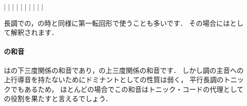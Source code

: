 \documentclass[dvipdfmx,uplatex,b5paper,openany,jbase=12Q,nomag*,textwidth-limit=44%
               ]{gachimuchi}[2020/05/05]
\begin{document}
\begin{floatMusic}[pos=ht]%
  \Startpiece%
  \znotes|\en
  \NOTes
  |%
  \en\bar
  \NOTEs
  |%
  \en\doublebar
  \NOTEs
  |%
  \en\bar
  \NOTEs
  |%
  \en\doublebar
  \NOTes
  |%
  \en\bar
  \NOTes
  \Mryaku\sk%
  |%
  \Mryaku\sk
  \en\setdoublebar
  \endpiece%
\end{floatMusic}

長調での\Gnii\Min ，\Gnii\Dimt の時と同様に第一転回形で使うことも多いです．
その場合にはとして解釈されます．

\paragraph{\bFlat\Gniii の和音}
\bFlat\Gniii は\Gnv\Min の下三度関係の和音であり，\Gni\Min の上三度関係の和音です．
しかし調の主音への上行導音を持たないためにドミナントとしての性質は弱く，
平行長調のトニックでもあるため，
ほとんどの場合でこの和音はトニック・コードの代理としての役割を果たすと言えるでしょう．
\end{document}
